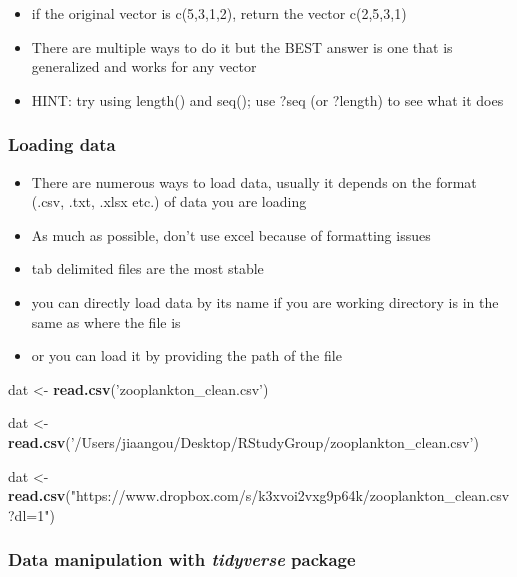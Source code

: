 \documentclass[]{article}
\newenvironment{Shaded}{\begin{snugshade}}{\end{snugshade}}
\newcommand{\KeywordTok}[1]{\textcolor[rgb]{0.13,0.29,0.53}{\textbf{{#1}}}}
\newcommand{\StringTok}[1]{\textcolor[rgb]{0.31,0.60,0.02}{{#1}}}
\newcommand{\NormalTok}[1]{{#1}}
\providecommand{\tightlist}{%
  \setlength{\itemsep}{0pt}\setlength{\parskip}{0pt}}
\begin{document}
\begin{itemize}
\tightlist
\item
  if the original vector is c(5,3,1,2), return the vector c(2,5,3,1)
\item
  There are multiple ways to do it but the BEST answer is one that is
  generalized and works for any vector
\item
  HINT: try using length() and seq(); use ?seq (or ?length) to see what
  it does
\end{itemize}

\subsubsection{Loading data}\label{loading-data}

\begin{itemize}
\tightlist
\item
  There are numerous ways to load data, usually it depends on the format
  (.csv, .txt, .xlsx etc.) of data you are loading
\item
  As much as possible, don't use excel because of formatting issues
\item
  tab delimited files are the most stable
\item
  you can directly load data by its name if you are working directory is
  in the same as where the file is
\item
  or you can load it by providing the path of the file
\end{itemize}

\begin{Shaded}
\begin{Highlighting}[]
\NormalTok{dat <-}\StringTok{ }\KeywordTok{read.csv}\NormalTok{(}\StringTok{'zooplankton_clean.csv'}\NormalTok{)}

\NormalTok{dat <-}\StringTok{ }\KeywordTok{read.csv}\NormalTok{(}\StringTok{'/Users/jiaangou/Desktop/RStudyGroup/zooplankton_clean.csv'}\NormalTok{)}

\NormalTok{dat <-}\StringTok{ }\KeywordTok{read.csv}\NormalTok{(}\StringTok{"https://www.dropbox.com/s/k3xvoi2vxg9p64k/zooplankton_clean.csv?dl=1"}\NormalTok{)}
\end{Highlighting}
\end{Shaded}

\subsubsection{\texorpdfstring{Data manipulation with \emph{tidyverse}
package}{Data manipulation with tidyverse package}}\label{data-manipulation-with-tidyverse-package}
\end{document}
